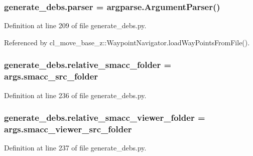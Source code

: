 \subsubsection[{\texorpdfstring{parser}{parser}}]{\setlength{\rightskip}{0pt plus 5cm}generate\+\_\+debs.\+parser = argparse.\+Argument\+Parser()}\hypertarget{namespacegenerate__debs_a4a9ae4bb85fc62d7973ea3d09ced6c26}{}\label{namespacegenerate__debs_a4a9ae4bb85fc62d7973ea3d09ced6c26}


Definition at line 209 of file generate\+\_\+debs.\+py.



Referenced by cl\+\_\+move\+\_\+base\+\_\+z\+::\+Waypoint\+Navigator.\+load\+Way\+Points\+From\+File().

\subsubsection[{\texorpdfstring{relative\+\_\+smacc\+\_\+folder}{relative_smacc_folder}}]{\setlength{\rightskip}{0pt plus 5cm}generate\+\_\+debs.\+relative\+\_\+smacc\+\_\+folder = args.\+smacc\+\_\+src\+\_\+folder}\hypertarget{namespacegenerate__debs_abf6925bd06ac1da3981fe638eefb5a61}{}\label{namespacegenerate__debs_abf6925bd06ac1da3981fe638eefb5a61}


Definition at line 236 of file generate\+\_\+debs.\+py.

\subsubsection[{\texorpdfstring{relative\+\_\+smacc\+\_\+viewer\+\_\+folder}{relative_smacc_viewer_folder}}]{\setlength{\rightskip}{0pt plus 5cm}generate\+\_\+debs.\+relative\+\_\+smacc\+\_\+viewer\+\_\+folder = args.\+smacc\+\_\+viewer\+\_\+src\+\_\+folder}\hypertarget{namespacegenerate__debs_a22d892b78adfce583710d78737eb4747}{}\label{namespacegenerate__debs_a22d892b78adfce583710d78737eb4747}


Definition at line 237 of file generate\+\_\+debs.\+py.

